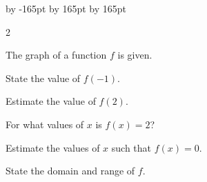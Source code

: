 \documentclass{sebase}
\begin{document}
\setlength{\columnsep}{24pt}
\advance \leftskip by -165pt
\advance\hsize by 165pt
\advance\linewidth by 165pt
\begin{multicols}{2}
%

\begin{ExerciseList}
\item[$\hfill $1.] The graph of a function $f$ is given.\vspace{-3pt}

\begin{ExerciseList}
\item[(a)] State the value of $f(-1)$.

%

\item[(b)] Estimate the value of $f(2)$.

%

\item[(c)] For what values of $x$ is $f(x)=2$?

%

\item[(d)] Estimate the values of $x$ such that $f(x)=0$.

%

\item[(e)] State the domain and range of $f$.

%


\end{ExerciseList}
\end{ExerciseList}
\end{multicols}
\end{document}
